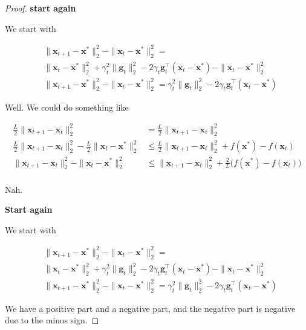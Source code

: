 \documentclass{article}
\begin{document}
\begin{proof}
	\textbf{start again}
	
	We start with
	
	\begin{align}
		&\|\mathbf{x}_{t+1} - \mathbf{x}^*\|^2_2 - \|\mathbf{x}_{t} - \mathbf{x}^*\|^2_2= \\
		&\|\mathbf{x}_t  - \mathbf{x}^* \|^2_2 + \gamma_t^2\|\mathbf{g}_t\|^2_2 - 2 \gamma_t\mathbf{g}^\top_t(\mathbf{x}_t - \mathbf{x}^*) -  \|\mathbf{x}_{t} - \mathbf{x}^*\|^2_2 \\
		&\|\mathbf{x}_{t+1} - \mathbf{x}^*\|^2_2 - \|\mathbf{x}_{t} - \mathbf{x}^*\|^2_2= \gamma_t^2\|\mathbf{g}_t\|^2_2 - 2 \gamma_t\mathbf{g}^\top_t(\mathbf{x}_t - \mathbf{x}^*) 
	\end{align}
	
	Well. We could do something like 
	
	\begin{align}
		\frac{L}{2}\|\mathbf{x}_{t+1}-\mathbf{x}_t\|^2_2 &= \frac{L}{2}\|\mathbf{x}_{t+1}-\mathbf{x}_t\|^2_2\\
		\frac{L}{2}\|\mathbf{x}_{t+1}-\mathbf{x}_t\|^2_2 -\frac{L}{2}\|\mathbf{x}_{t} - \mathbf{x}^*\|^2_2  & \le  \frac{L}{2}\|\mathbf{x}_{t+1}-\mathbf{x}_t\|^2_2 +  f(\mathbf{x}^*) -  f(\mathbf{x}_{t}) \\
		\|\mathbf{x}_{t+1}-\mathbf{x}_t\|^2_2 - \|\mathbf{x}_{t} - \mathbf{x}^*\|^2_2  & \le  \|\mathbf{x}_{t+1}-\mathbf{x}_t\|^2_2 +  \frac{2}{L}\big(f(\mathbf{x}^*) -  f(\mathbf{x}_{t})\big) \\
	\end{align}
	
	Nah.
	
	\textbf{Start again}
	
	We start with
	
	\begin{align}
		&\|\mathbf{x}_{t+1} - \mathbf{x}^*\|^2_2 - \|\mathbf{x}_{t} - \mathbf{x}^*\|^2_2= \\
		&\|\mathbf{x}_t  - \mathbf{x}^* \|^2_2 + \gamma_t^2\|\mathbf{g}_t\|^2_2 - 2 \gamma_t\mathbf{g}^\top_t(\mathbf{x}_t - \mathbf{x}^*) -  \|\mathbf{x}_{t} - \mathbf{x}^*\|^2_2 \\
		&\|\mathbf{x}_{t+1} - \mathbf{x}^*\|^2_2 - \|\mathbf{x}_{t} - \mathbf{x}^*\|^2_2= \gamma_t^2\|\mathbf{g}_t\|^2_2 - 2 \gamma_t\mathbf{g}^\top_t(\mathbf{x}_t - \mathbf{x}^*) 
	\end{align}
	
	We have a positive part and a negative part, and the negative part is negative due to the minus sign. 
	

\end{proof}
\end{document}
